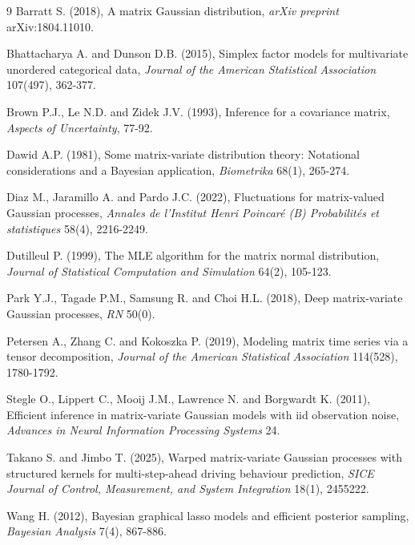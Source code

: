 \documentclass[twoside]{article}
\begin{document}
\begin{thebibliography}{9}
Barratt S. (2018), A matrix Gaussian distribution, {\it arXiv preprint} arXiv:1804.11010.

Bhattacharya A. and Dunson D.B. (2015), Simplex factor models for multivariate unordered categorical data, {\it Journal of the American Statistical Association} 107(497), 362-377.

Brown P.J., Le N.D. and Zidek J.V. (1993), Inference for a covariance matrix, {\it Aspects of Uncertainty}, 77-92.

Dawid A.P. (1981), Some matrix-variate distribution theory: Notational considerations and a Bayesian application, {\it Biometrika} 68(1), 265-274.

Diaz M., Jaramillo A. and Pardo J.C. (2022), Fluctuations for matrix-valued Gaussian processes, {\it Annales de l'Institut Henri Poincar\'e (B) Probabilit\'es et statistiques} 58(4), 2216-2249.

Dutilleul P. (1999), The MLE algorithm for the matrix normal distribution, {\it Journal of Statistical Computation and Simulation} 64(2), 105-123.

Park Y.J., Tagade P.M., Samsung R. and Choi H.L. (2018), Deep matrix-variate Gaussian processes, {\it RN} 50(0).

Petersen A., Zhang C. and Kokoszka P. (2019), Modeling matrix time series via a tensor decomposition, {\it Journal of the American Statistical Association} 114(528), 1780-1792.

Stegle O., Lippert C., Mooij J.M., Lawrence N. and Borgwardt K. (2011), Efficient inference in matrix-variate Gaussian models with iid observation noise, {\it Advances in Neural Information Processing Systems} 24.

Takano S. and Jimbo T. (2025), Warped matrix-variate Gaussian processes with structured kernels for multi-step-ahead driving behaviour prediction, {\it SICE Journal of Control, Measurement, and System Integration} 18(1), 2455222.

Wang H. (2012), Bayesian graphical lasso models and efficient posterior sampling, {\it Bayesian Analysis} 7(4), 867-886.

\end{thebibliography}
\end{document}
